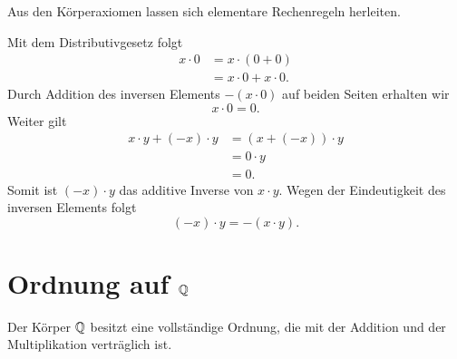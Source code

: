 
Aus den Körperaxiomen lassen sich elementare Rechenregeln herleiten.


\begin{myproof}
	Mit dem Distributivgesetz folgt
	\begin{align*}
		x\cdot 0
		&=x\cdot(0+0)\\
		&=x\cdot 0+x\cdot 0.
	\end{align*}
	Durch Addition des inversen Elements $-(x\cdot 0)$ auf beiden Seiten erhalten wir
	\[
	x\cdot 0=0.
	\]
	Weiter gilt
	\begin{align*}
		x\cdot y+(-x)\cdot y
		&=(x+(-x))\cdot y\\
		&=0\cdot y\\
		&=0.
	\end{align*}
	Somit ist $(-x)\cdot y$ das additive Inverse von $x\cdot y$. Wegen der Eindeutigkeit des inversen Elements folgt
	\[
	(-x)\cdot y=-(x\cdot y).
	\]
\end{myproof}

\section{Ordnung auf $\mathbb{Q}$}


Der Körper $\mathbb{Q}$ besitzt eine vollständige Ordnung, die mit der Addition und der Multiplikation verträglich ist.


